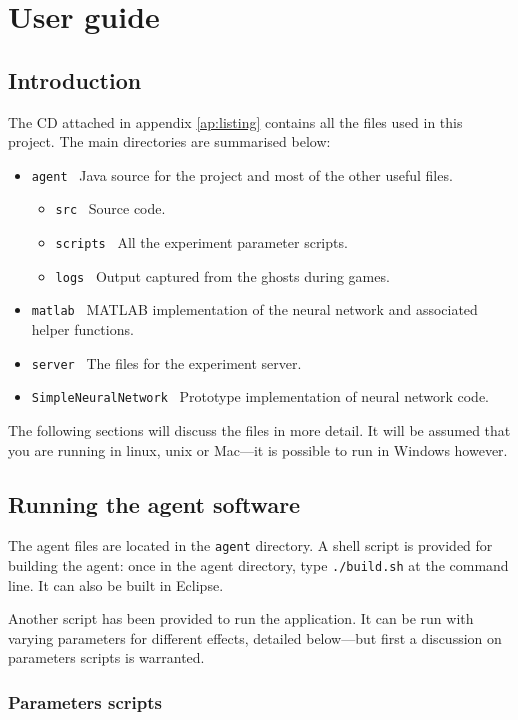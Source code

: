 \chapter{User guide}
\label{ch:userguide}

\section{Introduction}

The CD attached in appendix \ref{ap:listing} contains all the files used in this project.  The main directories are summarised below:

\begin{itemize}
\item {\tt agent} ~Java source for the project and most of the other useful files.
\begin {itemize}
\item {\tt src} ~Source code.
\item {\tt scripts} ~All the experiment parameter scripts.
\item {\tt logs} ~Output captured from the ghosts during games.
\end {itemize}
\item {\tt matlab} ~MATLAB implementation of the neural network and associated helper functions.
\item {\tt server} ~The files for the experiment server.
\item {\tt SimpleNeuralNetwork} ~Prototype implementation of neural network code.
\end{itemize}

The following sections will discuss the files in more detail.  It will be assumed that you are running in linux, unix or Mac---it is possible to run in Windows however.

\section{Running the agent software}

The agent files are located in the {\tt agent} directory.  A shell script is provided for building the agent: once in the agent directory, type {\tt ./build.sh} at the command line.  It can also be built in Eclipse.

Another script has been provided to run the application.  It can be run with varying parameters for different effects, detailed below---but first a discussion on parameters scripts is warranted.

\subsection{Parameters scripts}

